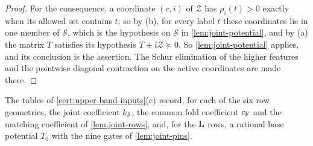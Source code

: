 \begin{proof}
For the consequence, a coordinate $(c,i)$ of $\mathcal Z$ has $\rho_i(t)>0$ exactly when
its allowed set contains $t$; so by (b), for every label $t$ these coordinates lie in
one member of $\mathcal S$, which is the hypothesis on $\mathcal S$ in
\cref{lem:joint-potential}, and by (a) the matrix $T$ satisfies its hypothesis
$T\pm i\mathcal Z\succeq0$. So \cref{lem:joint-potential} applies, and its conclusion is
the assertion. The Schur elimination of the higher features and the pointwise
diagonal contraction on the active coordinates are made there.
\end{proof}

The tables of \cref{cert:upper-band-inputs}(c) record, for each of the six row
geometries, the joint coefficient $k_{\rm J}$, the common fold coefficient $c_{\rm F}$
and the matching coefficient of \cref{lem:joint-rows}, and, for the $\rm L$ rows, a
rational base potential $T_0$ with the nine gates of \cref{lem:joint-pins}.

